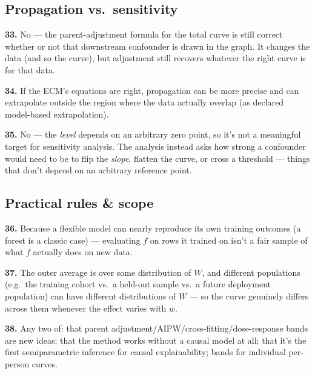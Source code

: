 \documentclass[11pt]{article}
\newcommand{\qa}[2]{\par\noindent\textbf{#1.} #2\par\smallskip}
\begin{document}
\subsection*{Propagation vs.\ sensitivity}
\qa{33}{No --- the parent-adjustment formula for the total curve is still
  correct whether or not that downstream confounder is drawn in the graph.
  It changes the data (and so the curve), but adjustment still recovers
  whatever the right curve is for that data.}
\qa{34}{If the ECM's equations are right, propagation can be more precise
  and can extrapolate outside the region where the data actually overlap
  (as declared model-based extrapolation).}
\qa{35}{No --- the \emph{level} depends on an arbitrary zero point, so it's
  not a meaningful target for sensitivity analysis. The analysis instead
  asks how strong a confounder would need to be to flip the \emph{slope},
  flatten the curve, or cross a threshold --- things that don't depend on
  an arbitrary reference point.}

\subsection*{Practical rules \& scope}
\qa{36}{Because a flexible model can nearly reproduce its own training
  outcomes (a forest is a classic case) --- evaluating $f$ on rows it
  trained on isn't a fair sample of what $f$ actually does on new data.}
\qa{37}{The outer average is over some distribution of $W$, and different
  populations (e.g.\ the training cohort vs.\ a held-out sample vs.\ a
  future deployment population) can have different distributions of $W$
  --- so the curve genuinely differs across them whenever the effect
  varies with $w$.}
\qa{38}{Any two of: that parent adjustment/AIPW/cross-fitting/dose-response
  bands are new ideas; that the method works without a causal model at
  all; that it's the first semiparametric inference for causal
  explainability; bands for individual per-person curves.}
\end{document}
